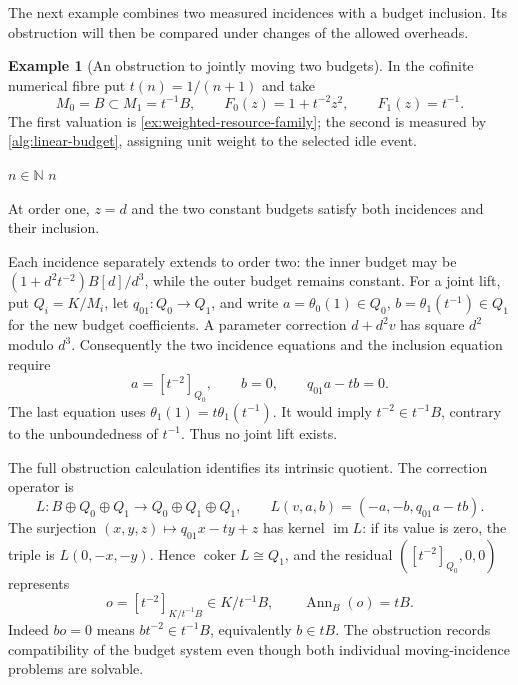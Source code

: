 \documentclass[11pt,a4paper]{article}
\numberwithin{algorithm}{section}
\numberwithin{equation}{section}
\theoremstyle{definition}
\newtheorem{example}[example]{Example}
\theoremstyle{remark}
\theoremstyle{plain}
\newcommand{\N}{\mathbb N}
\newcommand{\im}{\operatorname{im}}
\newcommand{\Ann}{\operatorname{Ann}}
\theoremstyle{definition}
\theoremstyle{plain}
\begin{document}
The next example combines two measured incidences with a budget
inclusion. Its obstruction will then be compared under changes of the
allowed overheads.

\begin{example}[An obstruction to jointly moving two budgets]
\label{ex:coupled-budget-obstruction}
In the cofinite numerical fibre put $t(n)=1/(n+1)$ and take
\[
 M_0=B\subset M_1=t^{-1}B,\qquad
 F_0(z)=1+t^{-2}z^2,\qquad F_1(z)=t^{-1}.
\]
The first valuation is \cref{ex:weighted-resource-family}; the second
is measured by \cref{alg:linear-budget}, assigning unit weight to
the selected idle event.
\begin{algorithm}[H]
\caption{The measured linear resource in the coupled-budget example}\label{alg:linear-budget}
\small
\begin{algorithmic}[1]
\Require $n\in\N$
  \State {}
\EndFor
\State \Return $n$
\end{algorithmic}
\end{algorithm}
At order one, $z=d$ and the two constant budgets satisfy both
incidences and their inclusion.

Each incidence separately extends to order two: the inner budget may
be $(1+d^2t^{-2})B[d]/d^3$, while the outer budget remains constant.
For a joint lift, put $Q_i=K/M_i$, let $q_{01}:Q_0\to Q_1$, and
write $a=\theta_0(1)\in Q_0$, $b=\theta_1(t^{-1})\in Q_1$ for the
new budget coefficients. A parameter correction $d+d^2v$ has square
$d^2$ modulo $d^3$. Consequently the two incidence equations and the
inclusion equation require
\[
 a=[t^{-2}]_{Q_0},\qquad b=0,\qquad q_{01}a-tb=0.
\]
The last equation uses $\theta_1(1)=t\theta_1(t^{-1})$.
It would imply $t^{-2}\in t^{-1}B$, contrary to the unboundedness
of $t^{-1}$. Thus no joint lift exists.

The full obstruction calculation identifies its intrinsic quotient.
The correction operator is
\[
 L:B\oplus Q_0\oplus Q_1\longrightarrow Q_0\oplus Q_1\oplus Q_1,
 \qquad L(v,a,b)=(-a,-b,q_{01}a-tb).
\]
The surjection $(x,y,z)\mapsto q_{01}x-ty+z$ has kernel
$\im L$: if its value is zero, the triple is $L(0,-x,-y)$.
Hence $\operatorname{coker}L\cong Q_1$, and the residual
$([t^{-2}]_{Q_0},0,0)$ represents
\begin{equation}\label{eq:coupled-budget-obstruction}
 o=[t^{-2}]_{K/t^{-1}B}\in K/t^{-1}B,\qquad \Ann_B(o)=tB.
\end{equation}
Indeed $bo=0$ means $bt^{-2}\in t^{-1}B$, equivalently $b\in tB$.
The obstruction records compatibility of the budget system even
though both individual moving-incidence problems are solvable.
\end{example}
\end{document}
